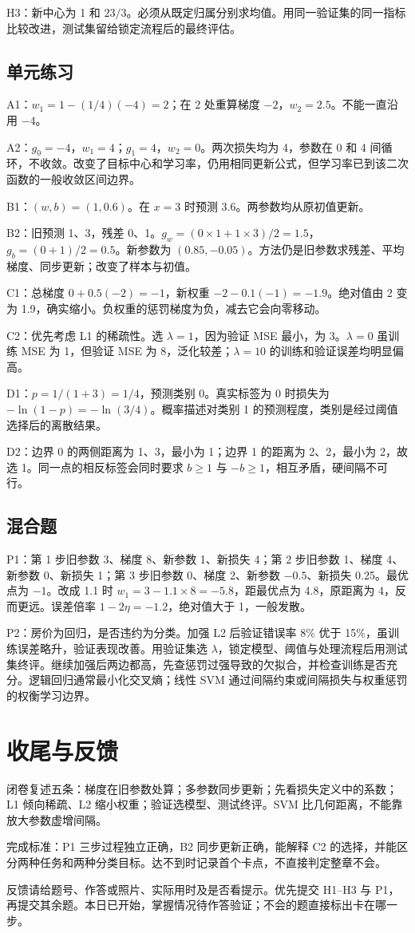 \documentclass[UTF8,a4paper,11pt]{ctexart}
\begin{document}
H3：新中心为 1 和 $23/3$。必须从既定归属分别求均值。用同一验证集的同一指标比较改进，测试集留给锁定流程后的最终评估。

\subsection{单元练习}
A1：$w_1=1-(1/4)(-4)=2$；在 2 处重算梯度 $-2$，$w_2=2.5$。不能一直沿用 $-4$。

A2：$g_0=-4$，$w_1=4$；$g_1=4$，$w_2=0$。两次损失均为 4，参数在 0 和 4 间循环，不收敛。改变了目标中心和学习率，仍用相同更新公式，但学习率已到该二次函数的一般收敛区间边界。

B1：$(w,b)=(1,0.6)$。在 $x=3$ 时预测 $3.6$。两参数均从原初值更新。

B2：旧预测 1、3，残差 0、1。$g_w=(0\times1+1\times3)/2=1.5$，$g_b=(0+1)/2=0.5$。新参数为 $(0.85,-0.05)$。方法仍是旧参数求残差、平均梯度、同步更新；改变了样本与初值。

C1：总梯度 $0+0.5(-2)=-1$，新权重 $-2-0.1(-1)=-1.9$。绝对值由 2 变为 1.9，确实缩小。负权重的惩罚梯度为负，减去它会向零移动。

C2：优先考虑 L1 的稀疏性。选 $\lambda=1$，因为验证 MSE 最小，为 3。$\lambda=0$ 虽训练 MSE 为 1，但验证 MSE 为 8，泛化较差；$\lambda=10$ 的训练和验证误差均明显偏高。

D1：$p=1/(1+3)=1/4$，预测类别 0。真实标签为 0 时损失为 $-\ln(1-p)=-\ln(3/4)$。概率描述对类别 1 的预测程度，类别是经过阈值选择后的离散结果。

D2：边界 0 的两侧距离为 1、3，最小为 1；边界 1 的距离为 2、2，最小为 2，故选 1。同一点的相反标签会同时要求 $b\geq1$ 与 $-b\geq1$，相互矛盾，硬间隔不可行。

\subsection{混合题}
P1：第 1 步旧参数 3、梯度 8、新参数 1、新损失 4；第 2 步旧参数 1、梯度 4、新参数 0、新损失 1；第 3 步旧参数 0、梯度 2、新参数 $-0.5$、新损失 0.25。最优点为 $-1$。改成 1.1 时 $w_1=3-1.1\times8=-5.8$，距最优点为 4.8，原距离为 4，反而更远。误差倍率 $1-2\eta=-1.2$，绝对值大于 1，一般发散。

P2：房价为回归，是否违约为分类。加强 L2 后验证错误率 8\% 优于 15\%，虽训练误差略升，验证表现改善。用验证集选 $\lambda$，锁定模型、阈值与处理流程后用测试集终评。继续加强后两边都高，先查惩罚过强导致的欠拟合，并检查训练是否充分。逻辑回归通常最小化交叉熵；线性 SVM 通过间隔约束或间隔损失与权重惩罚的权衡学习边界。

\section{收尾与反馈}
闭卷复述五条：梯度在旧参数处算；多参数同步更新；先看损失定义中的系数；L1 倾向稀疏、L2 缩小权重；验证选模型、测试终评。SVM 比几何距离，不能靠放大参数虚增间隔。

完成标准：P1 三步过程独立正确，B2 同步更新正确，能解释 C2 的选择，并能区分两种任务和两种分类目标。达不到时记录首个卡点，不直接判定整章不会。

反馈请给题号、作答或照片、实际用时及是否看提示。优先提交 H1–H3 与 P1，再提交其余题。本日已开始，掌握情况待作答验证；不会的题直接标出卡在哪一步。
\end{document}
